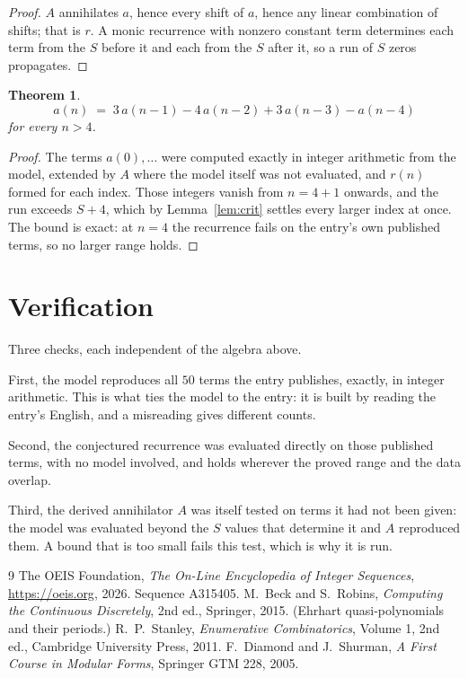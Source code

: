 \documentclass[11pt,a4paper]{article}
\theoremstyle{plain}
\newtheorem{theorem}{Theorem}
\theoremstyle{definition}
\begin{document}
\begin{proof}
$A$ annihilates $a$, hence every shift of $a$, hence any linear combination of shifts; that is
$r$. A monic recurrence with nonzero constant term determines each term from the $S$ before it
and each from the $S$ after it, so a run of $S$ zeros propagates.
\end{proof}

\begin{theorem}
\[
a(n)\;=\;3\,a(n-1) - 4\,a(n-2) + 3\,a(n-3) - a(n-4)
\]
for every $n>4$.
\end{theorem}

\begin{proof}
The terms $a(0),\dots$ were computed exactly in integer arithmetic from the model, extended by
$A$ where the model itself was not evaluated, and $r(n)$ formed for each index. Those integers
vanish from $n=4+1$ onwards, and the run exceeds $S+4$, which by
Lemma~\ref{lem:crit} settles every larger index at once. The bound is exact: at $n=4$ the recurrence fails on the entry's own published terms, so no larger range holds.
\end{proof}

\section{Verification}

Three checks, each independent of the algebra above.

First, the model reproduces all $50$ terms the entry publishes, exactly, in integer
arithmetic. This is what ties the model to the entry: it is built by reading the entry's
English, and a misreading gives different counts.

Second, the conjectured recurrence was evaluated directly on those published terms, with no
model involved, and holds wherever the proved range and the data overlap.

Third, the derived annihilator $A$ was itself tested on terms it had not been given: the model
was evaluated beyond the $S$ values that determine it and $A$ reproduced them. A bound that is
too small fails this test, which is why it is run.

\begin{thebibliography}{9}
 The OEIS Foundation, \emph{The On-Line Encyclopedia of Integer
Sequences}, \url{https://oeis.org}, 2026. Sequence A315405.
 M.~Beck and S.~Robins, \emph{Computing the Continuous Discretely},
2nd ed., Springer, 2015. (Ehrhart quasi-polynomials and their periods.)
 R.~P.~Stanley, \emph{Enumerative Combinatorics}, Volume 1, 2nd ed.,
Cambridge University Press, 2011.
 F.~Diamond and J.~Shurman, \emph{A First Course in Modular Forms},
Springer GTM 228, 2005.
\end{thebibliography}
\end{document}
